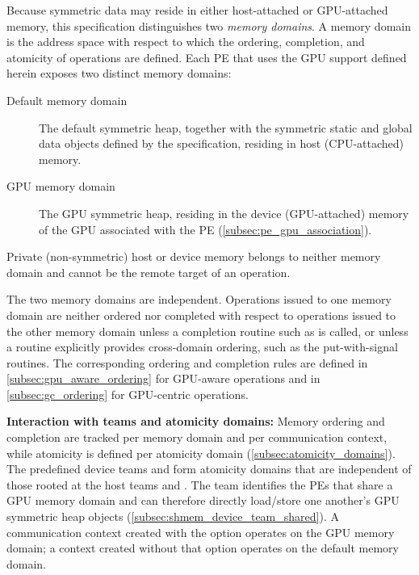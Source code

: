 Because symmetric data may reside in either host-attached or GPU-attached memory,
this specification distinguishes two \emph{memory domains}. A memory domain is
the address space with respect to which the ordering, completion, and atomicity
of \openshmem operations are defined. Each \ac{PE} that uses the GPU support
defined herein exposes two distinct memory domains:

\begin{description}
\item[Default memory domain] The default symmetric heap, together with the
symmetric static and global data objects defined by the \openshmem
specification, residing in host (CPU-attached) memory.
\item[\ac{GPU} memory domain] The \ac{GPU} symmetric heap, residing in the
device (GPU-attached) memory of the \ac{GPU} associated with the \ac{PE}
(\cref{subsec:pe_gpu_association}).
\end{description}

Private (non-symmetric) host or device memory belongs to neither memory domain
and cannot be the remote target of an \openshmem operation.

The two memory domains are independent. Operations issued to one memory domain
are neither ordered nor completed with respect to operations issued to the other
memory domain unless a completion routine such as  is called,
or unless a routine explicitly provides cross-domain ordering, such as the
put-with-signal routines. The corresponding ordering and completion rules are
defined in \cref{subsec:gpu_aware_ordering} for GPU-aware operations and in
\cref{subsec:gc_ordering} for GPU-centric operations.

\textbf{Interaction with teams and atomicity domains:} Memory ordering and
completion are tracked per memory domain and per communication context, while
atomicity is defined per atomicity domain (\cref{subsec:atomicity_domains}). The
predefined device teams  and
 form atomicity domains that are independent
of those rooted at the host teams  and
. The team 
identifies the \acp{PE} that share a \ac{GPU} memory domain and can therefore
directly load/store one another's \ac{GPU} symmetric heap objects
(\cref{subsec:shmem_device_team_shared}). A communication context created with
the  option operates on the \ac{GPU} memory domain;
a context created without that option operates on the default memory domain.

